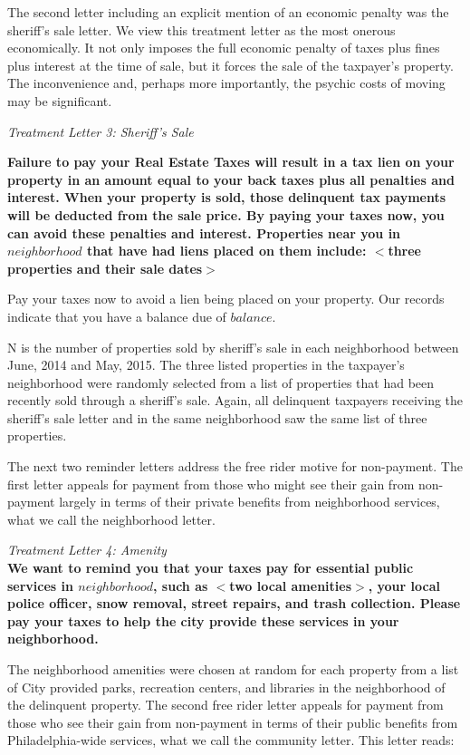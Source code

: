 \documentclass[12pt]{article}
\begin{document}
The second letter including an explicit mention of an economic penalty
was the sheriff's sale letter.  We view this treatment letter as the
most onerous economically.  It not only imposes the full economic
penalty of taxes plus fines plus interest at the time of sale, but it
forces the sale of the taxpayer's property.  The inconvenience and,
perhaps more importantly, the psychic costs of moving may be
significant.  
  
{\it Treatment Letter 3: Sheriff's Sale} \\ {\bf Failure to pay your
  Real Estate Taxes will result in a tax lien on your property in an
  amount equal to your back taxes plus all penalties and
  interest. When your property is sold, those delinquent tax payments
  will be deducted from the sale price. By paying your taxes now, you
  can avoid these penalties and interest. Properties near you in
  $neighborhood$ that have had liens placed on them include: $<$three
  properties and their sale dates$>$

  Pay your taxes now to avoid a lien being placed on your property.
  Our records indicate that you have a balance due of $balance$.}
  
N is the number of properties sold by sheriff's sale in each
neighborhood between June, 2014 and May, 2015.  The three listed
properties in the taxpayer's neighborhood were randomly selected from
a list of properties that had been recently sold through a sheriff's
sale.  Again, all delinquent taxpayers receiving the sheriff's sale
letter and in the same neighborhood saw the same list of three
properties.

The next two reminder letters address the free rider motive for
non-payment.  The first letter appeals for payment from those who
might see their gain from non-payment largely in terms of their
private benefits from neighborhood services, what we call the
neighborhood letter.  

{\it Treatment Letter 4: Amenity } \\ {\bf We want to remind you that
  your taxes pay for essential public services in $neighborhood$, such
  as $<$two local amenities$>$, your local police officer, snow
  removal, street repairs, and trash collection. Please pay your taxes
  to help the city provide these services in your neighborhood.}

The neighborhood amenities were chosen at random for each property
from a list of City provided parks, recreation centers, and libraries
in the neighborhood of the delinquent property.  The second free rider
letter appeals for payment from those who see their gain from
non-payment in terms of their public benefits from Philadelphia-wide
services, what we call the community letter.  This letter reads:
\end{document}
